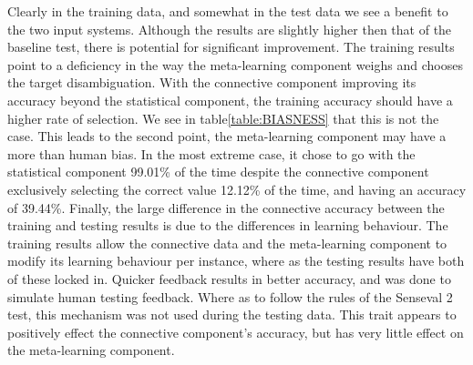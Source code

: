 Clearly in the training data, and somewhat in the test data we see a benefit to the two input systems. Although the results are slightly higher then that of the baseline test, there is potential for significant improvement.  The training results point to a deficiency in the way the meta-learning component weighs and chooses the target disambiguation.  With the connective component improving its accuracy beyond the statistical component, the training accuracy should have a higher rate of selection. We see in table\ref{table:BIASNESS} that this is not the case. This leads to the second point, the meta-learning component may have a more than human bias.  In the most extreme case, it chose to go with the statistical component 99.01\% of the time despite the connective component exclusively selecting the correct value 12.12\% of the time, and having an accuracy of 39.44\%. Finally, the large difference in the connective accuracy between the training and testing results is due to the differences in learning behaviour.  The training results allow the connective data and the meta-learning component to modify its learning behaviour per instance, where as the testing results have both of these locked in.  Quicker feedback results in better accuracy, and was done to simulate human testing feedback. Where as to follow the rules of the Senseval 2 test, this mechanism was not used during the testing data.  This trait appears to positively effect the connective component's accuracy, but has very little effect on the meta-learning component.

